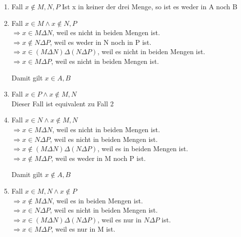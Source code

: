 \documentclass{article}
\begin{document}
        \begin{enumerate}
            \item Fall \( x \notin M, N, P \)
            Ist x in keiner der drei Menge, so ist es weder in A noch B 

            \item Fall \(x \in M \land x \notin N, P\) \\
            \(\Rightarrow x \in M \Delta N \), weil es nicht in beiden Mengen ist. \\
            \(\Rightarrow x \notin N \Delta P \), weil es weder in N noch in P ist. \\
            \(\Rightarrow x \in ( M \Delta N )\Delta(N \Delta P ) \), weil es nicht in beiden Mengen ist. \\
            \(\Rightarrow x \in M \Delta P \), weil es nicht in beiden Mengen ist.

            Damit gilt \(x \in A, B \)

            \item Fall \(x \in P \land x \notin M, N\) \\
            Dieser Fall ist equivalent zu Fall 2
            
            \item Fall \(x \in N \land x \notin M, N \) \\
            \(\Rightarrow x \in M \Delta N \), weil es nicht in beiden Mengen ist. \\
            \(\Rightarrow x \in N \Delta P \), weil es nicht in beiden Mengen ist. \\
            \(\Rightarrow x \notin ( M \Delta N )\Delta(N \Delta P ) \), weil es in beiden Mengen ist. \\
            \(\Rightarrow x \notin M \Delta P \), weil es weder in M noch P ist.

            Damit gilt \(x \notin A, B \) 

            \item Fall \(x \in M, N \land x \notin P \) \\
            \(\Rightarrow x \notin M \Delta N \), weil es in beiden Mengen ist. \\
            \(\Rightarrow x \in N \Delta P \), weil es nicht in beiden Mengen ist. \\
            \(\Rightarrow x \in ( M \Delta N )\Delta(N \Delta P ) \), weil es nur in \(N \Delta P\) ist. \\
            \(\Rightarrow x \in M \Delta P \), weil es nur in M ist.


\end{enumerate}
\end{document}
